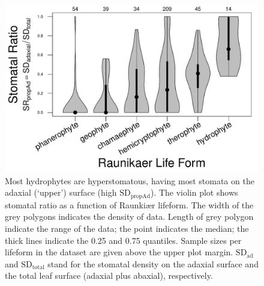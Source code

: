 \documentclass[12pt, oneside]{article}
\begin{document}
\begin{figure}[ht]
\centerline{\includegraphics{figures/figureS_violin.pdf}}
\caption{Most hydrophytes are hyperstomatous, having most stomata on the adaxial (`upper') surface (high $\mathrm{SD_{propAd}}$). The violin plot shows stomatal ratio as a function of Raunki\ae r lifeform. The width of the grey polygons indicates the density of data. Length of grey polygon indicate the range of the data; the point indicates the median; the thick lines indicate the 0.25 and 0.75 quantiles. Sample sizes per lifeform in the dataset are given above the upper plot margin. $\mathrm{SD_{ad}}$ and $\mathrm{SD_{total}}$ stand for the stomatal density on the adaxial surface and the total leaf surface (adaxial plus abaxial), respectively.}
\label{fig:violin}
\end{figure}
\end{document}

